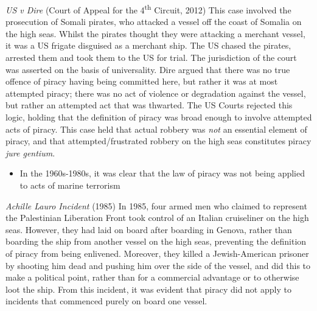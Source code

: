 \begin{casedetails}{\textit{US v Dire} (Court of Appeal for the 4\textsuperscript{th} Circuit, 2012)}
    \flushleft
    This case involved the prosecution of Somali pirates, who attacked a vessel off the coast of Somalia on the high seas. Whilst the pirates thought they were attacking a merchant vessel, it was a US frigate disguised as a merchant ship. The US chased the pirates, arrested them and took them to the US for trial. The jurisdiction of the court was asserted on the basis of universality. Dire argued that there was no true offence of piracy having being committed here, but rather it was at most attempted piracy; there was no act of violence or degradation against the vessel, but rather an attempted act that was thwarted. The US Courts rejected this logic, holding that the  definition of piracy was broad enough to involve attempted acts of piracy. This case held that actual robbery was \textit{not} an essential element of piracy, and that attempted/frustrated robbery on the high seas constitutes piracy \textit{jure gentium}.
\end{casedetails}

\begin{itemize}
    \item In the 1960s-1980s, it was clear that the law of piracy was not being applied to acts of marine terrorism
\end{itemize}

\begin{casedetails}{\textit{Achille Lauro Incident} (1985)}
    \flushleft
    In 1985, four armed men who claimed to represent the Palestinian Liberation Front took control of an Italian cruiseliner on the high seas. However, they had laid on board after boarding in Genova, rather than boarding the ship from another vessel on the high seas, preventing the definition of piracy from being enlivened. Moreover, they killed a Jewish-American prisoner by shooting him dead and pushing him over the side of the vessel, and did this to make a political point, rather than for a commercial advantage or to otherwise loot the ship. From this incident, it was evident that piracy did not apply to incidents that commenced purely on board one vessel.
\end{casedetails}

